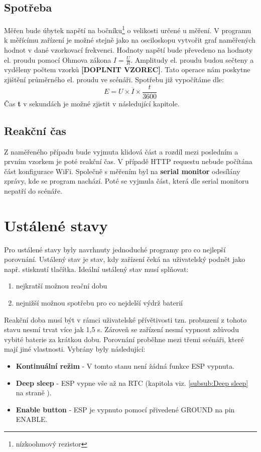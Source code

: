 \documentclass[a4paper, 12pt]{report}
\begin{document}
				\subsection{Spotřeba}
					Měřen bude úbytek napětí na bočníku\footnote{nízkoohmový rezistor} o velikosti určené u měření. V programu k měřícímu zařízení je možné stejně jako na osciloskopu vytvořit graf naměřených hodnot v dané vzorkovací frekvenci. Hodnoty napětí bude převedeno na hodnoty el. proudu pomocí Ohmova zákona $I = \frac{U}{R}$. Amplitudy el. proudu budou sečteny a vyděleny počtem vzorků {\bf[DOPLNIT VZOREC]}. Tato operace nám poskytne zjištění průměrného el. proudu ve scénáři. Spotřebu již vypočítáme dle:
					$$E = U \times \overline{I} \times \frac{t}{3600}$$
					Čas {\bf t} v sekundách je možné zjistit v následující kapitole.
				\subsection{Reakční čas}
					Z naměřeného případu bude vyjmuta klidová část a rozdíl mezi posledním a prvním vzorkem je poté reakční čas. V případě HTTP requestu nebude počítána část konfigurace WiFi. Společně s měřením byl na {\bf serial monitor} odesílány zprávy, kde se program nachází. Poté se vyjmula část, která dle serial monitoru nepatří do scénáře.

			\section{Ustálené stavy}
				Pro ustálené stavy byly navrhnuty jednoduché programy pro co nejlepší porovnání. Ustálený stav je stav, kdy zařízení čeká na uživatelský podnět jako např. stisknutí tlačítka. Ideální ustálený stav musí splňovat:
				\begin{enumerate}
					\item nejkratší možnou reační dobu
					\item nejnižší možnou spotřebu pro co nejdelší výdrž baterií
				\end{enumerate}
				Reakční doba musí být v rámci uživatelské přívětivosti tzn. probuzení z tohoto stavu nesmí trvat více jak 1,5 \si{s}. Zároveň se zařízení nesmí vypnout zdůvodu vybité baterie za krátkou dobu. Porovnání proběhne mezi třemi scénáři, které mají jiné vlastnosti. Vybrány byly následující:
				\begin{itemize}
					\item {\bf Kontinuální režim} - V tomto stanu není žádná funkce ESP vypnuta.
					\item {\bf Deep sleep} - ESP vypne vše až na RTC (kapitola viz. \ref{subsub:Deep sleep} na straně \pageref{subsub:Deep sleep}).
					\item {\bf Enable button} - ESP je vypnuto pomocí přivedené GROUND na pin ENABLE.
				\end{itemize}
\end{document}
